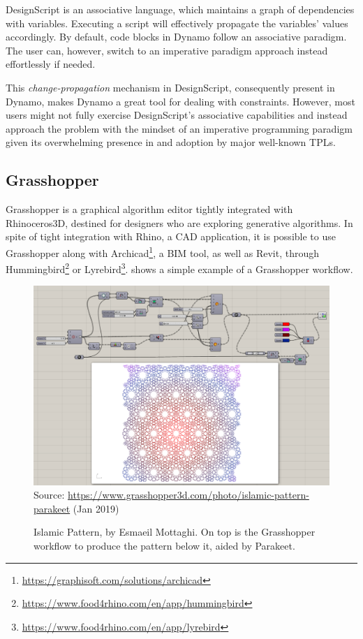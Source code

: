 DesignScript is an associative language, which maintains a graph of dependencies
with variables.  Executing a script will effectively propagate the variables'
values accordingly.  By default, code blocks in Dynamo follow an associative
paradigm.  The user can, however, switch to an imperative paradigm approach
instead effortlessly if needed.

This \textit{change-propagation} mechanism in DesignScript, consequently present
in Dynamo, makes Dynamo a great tool for dealing with constraints.  However,
most users might not fully exercise DesignScript's associative capabilities and
instead approach the problem with the mindset of an imperative programming
paradigm given its overwhelming presence in and adoption by major well-known
\acp{TPL}.

\subsection{Grasshopper}%
\label{sec:related.ad.grasshopper}

Grasshopper is a graphical algorithm editor tightly integrated with
Rhinoceros3D, destined for designers who are exploring generative algorithms.
In spite of tight integration with Rhino, a \ac{CAD} application, it is possible
to use Grasshopper along with
Archicad\textsuperscript{\textregistered}\footnote{\url{https://graphisoft.com/solutions/archicad}},
a \ac{BIM} tool, as well as Revit, through
Hummingbird\footnote{\url{https://www.food4rhino.com/en/app/hummingbird}} or
Lyrebird\footnote{\url{https://www.food4rhino.com/en/app/lyrebird}}.
 shows a simple example of a
Grasshopper workflow.

\begin{figure}[htb]
  \includegraphics[width=\textwidth]{fig/grasshopper-islamic-pattern}\\
  {\scriptsize
  Source: \url{https://www.grasshopper3d.com/photo/islamic-pattern-parakeet}
  (Jan 2019)
  }
  \caption[Islamic Pattern in Grasshopper using Parakeet]{
    Islamic Pattern, by Esmaeil Mottaghi.  On top is the Grasshopper workflow to
    produce the pattern below it, aided by
    Parakeet.}%
  \label{fig:related.ad.grasshopper.islamic-pattern}
\end{figure}

